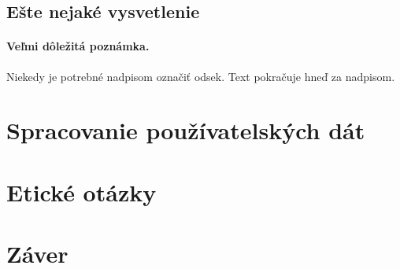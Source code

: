 \documentclass[10pt,twoside,slovak,a4paper]{article}
\begin{document}
\subsection{Ešte nejaké vysvetlenie} \label{ina:este}

\paragraph{Veľmi dôležitá poznámka.}
Niekedy je potrebné nadpisom označiť odsek. Text pokračuje hneď za nadpisom.



\section{Spracovanie používatelských dát} \label{dolezita}




\section{Etické otázky} \label{dolezitejsia}




\section{Záver} \label{zaver} %






\end{document}
